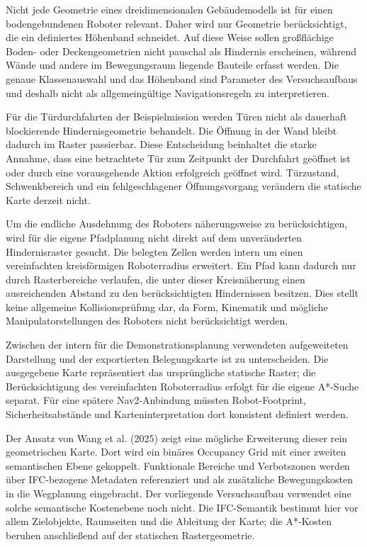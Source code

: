 Nicht jede Geometrie eines dreidimensionalen Gebäudemodells ist für einen bodengebundenen Roboter
relevant. Daher wird nur Geometrie berücksichtigt, die ein definiertes Höhenband schneidet. Auf
diese Weise sollen großflächige Boden- oder Deckengeometrien nicht pauschal als Hindernis
erscheinen, während Wände und andere im Bewegungsraum liegende Bauteile erfasst werden. Die genaue
Klassenauswahl und das Höhenband sind Parameter des Versuchsaufbaus und deshalb nicht als
allgemeingültige Navigationsregeln zu interpretieren.

Für die Türdurchfahrten der Beispielmission werden Türen nicht als dauerhaft blockierende
Hindernisgeometrie behandelt. Die Öffnung in der Wand bleibt dadurch im Raster passierbar. Diese
Entscheidung beinhaltet die starke Annahme, dass eine betrachtete Tür zum Zeitpunkt der Durchfahrt
geöffnet ist oder durch eine vorausgehende Aktion erfolgreich geöffnet wird. Türzustand,
Schwenkbereich und ein fehlgeschlagener Öffnungsvorgang verändern die statische Karte derzeit nicht.

Um die endliche Ausdehnung des Roboters näherungsweise zu berücksichtigen, wird für die eigene
Pfadplanung nicht direkt auf dem unveränderten Hindernisraster gesucht. Die belegten Zellen werden
intern um einen vereinfachten kreisförmigen Roboterradius erweitert. Ein Pfad kann dadurch nur durch
Rasterbereiche verlaufen, die unter dieser Kreisnäherung einen ausreichenden Abstand zu den
berücksichtigten Hindernissen besitzen. Dies stellt keine allgemeine Kollisionsprüfung dar, da Form,
Kinematik und mögliche Manipulatorstellungen des Roboters nicht berücksichtigt werden.

Zwischen der intern für die Demonstrationsplanung verwendeten aufgeweiteten Darstellung und der
exportierten Belegungskarte ist zu unterscheiden. Die ausgegebene Karte repräsentiert das
ursprüngliche statische Raster; die Berücksichtigung des vereinfachten Roboterradius erfolgt für die
eigene A*-Suche separat. Für eine spätere Nav2-Anbindung müssten Robot-Footprint,
Sicherheitsabstände und Karteninterpretation dort konsistent definiert werden.

Der Ansatz von Wang et al. (2025) zeigt eine mögliche Erweiterung dieser rein geometrischen Karte.
Dort wird ein binäres Occupancy Grid mit einer zweiten semantischen Ebene gekoppelt. Funktionale
Bereiche und Verbotszonen werden über IFC-bezogene Metadaten referenziert und als zusätzliche
Bewegungskosten in die Wegplanung eingebracht. Der vorliegende Versuchsaufbau verwendet eine solche
semantische Kostenebene noch nicht. Die IFC-Semantik bestimmt hier vor allem Zielobjekte, Raumseiten
und die Ableitung der Karte; die A*-Kosten beruhen anschließend auf der statischen Rastergeometrie.

